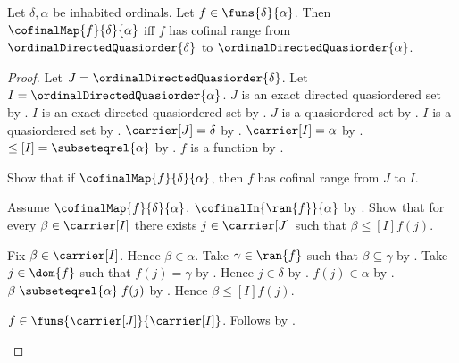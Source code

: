 \begin{theorem}\label{cofinal_map_iff_ordinal_cofinal_range}
    Let $\delta,\alpha$ be inhabited ordinals.
    Let $f\in\funs{\delta}{\alpha}$.
    Then $\cofinalMap{f}{\delta}{\alpha}$ iff
        $f$ has cofinal range from
            $\ordinalDirectedQuasiorder{\delta}$ to
            $\ordinalDirectedQuasiorder{\alpha}$.
\end{theorem}
\begin{proof}
    Let $J=\ordinalDirectedQuasiorder{\delta}$.
    Let $I=\ordinalDirectedQuasiorder{\alpha}$.
    $J$ is an exact directed quasiordered set by
        .
    $I$ is an exact directed quasiordered set by
        .
    $J$ is a quasiordered set by
        .
    $I$ is a quasiordered set by
        .
    $\carrier[J]=\delta$ by
        .
    $\carrier[I]=\alpha$ by
        .
    $\leq[I]=\subseteqrel{\alpha}$ by
        .
    $f$ is a function by .

    Show that if $\cofinalMap{f}{\delta}{\alpha}$, then
        $f$ has cofinal range from $J$ to $I$.
    \begin{subproof}
        Assume $\cofinalMap{f}{\delta}{\alpha}$.
        $\cofinalIn{\ran{f}}{\alpha}$ by .
        Show that for every $\beta\in\carrier[I]$ there exists
            $j\in\carrier[J]$ such that
            $\beta\mathrel{\leq[I]}f(j)$.
        \begin{subproof}
            Fix $\beta\in\carrier[I]$.
            Hence $\beta\in\alpha$.
            Take $\gamma\in\ran{f}$ such that
                $\beta\subseteq\gamma$ by .
            Take $j\in\dom{f}$ such that $f(j)=\gamma$ by
                .
            Hence $j\in\delta$ by .
            $f(j)\in\alpha$ by .
            $\beta\mathrel{\subseteqrel{\alpha}}f(j)$ by
                .
            Hence $\beta\mathrel{\leq[I]}f(j)$.
        \end{subproof}
        $f\in\funs{\carrier[J]}{\carrier[I]}$.
        Follows by .
    \end{subproof}


\end{proof}
